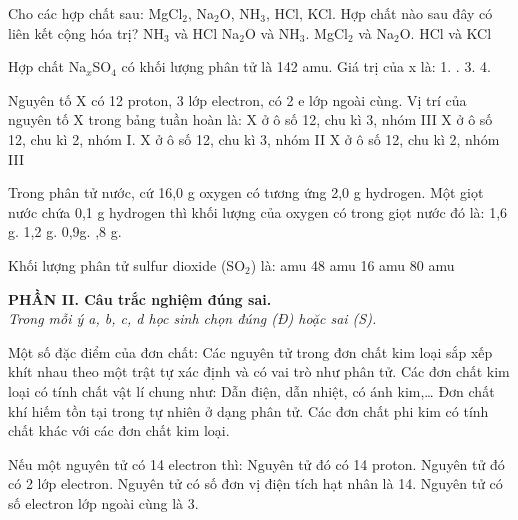 \documentclass[11pt,a4paper]{article}
\begin{document}
\begin{ex}
Cho các hợp chất sau: MgCl$_{2}$, Na$_{2}$O, NH$_{3}$, HCl, KCl. Hợp chất nào sau đây có liên kết cộng hóa trị?
\choice
{\True NH$_{3}$ và HCl}
{Na$_{2}$O và NH$_{3}$.}
{MgCl$_{2}$ và Na$_{2}$O.}
{HCl và KCl}
\end{ex}

\begin{ex}
Hợp chất Na$_{x}$SO$_{4}$ có khối lượng phân tử là 142 amu. Giá trị của x là:
\choice
{1.}
{.}
{3.}
{4.}
\end{ex}

\begin{ex}
Nguyên tố X có 12 proton, 3 lớp electron, có 2 e lớp ngoài cùng. Vị trí của nguyên tố X trong bảng tuần hoàn là:
\choice
{X ở ô số 12, chu kì 3, nhóm III}
{X ở ô số 12, chu kì 2, nhóm I.}
{\True X ở ô số 12, chu kì 3, nhóm II}
{X ở ô số 12, chu kì 2, nhóm III}
\end{ex}

\begin{ex}
Trong phân tử nước, cứ 16,0 g oxygen có tương ứng 2,0 g hydrogen. Một giọt nước chứa 0,1 g hydrogen thì khối lượng của oxygen có trong giọt nước đó là:
\choice
{1,6 g.}
{1,2 g.}
{0,9g.}
{,8 g.}
\end{ex}

\begin{ex}
Khối lượng phân tử sulfur dioxide (SO$_{2}$) là:
\choice
{ amu}
{48 amu}
{16 amu}
{80 amu}
\end{ex}


\vspace{4pt}
\noindent
\textbf{\color{mainGreen}PHẦN II. Câu trắc nghiệm đúng sai.}\\
\textit{Trong mỗi ý a, b, c, d học sinh chọn đúng (Đ) hoặc sai (S).}

\setcounter{ex}{0}

\begin{ex}
Một số đặc điểm của đơn chất:
\choiceTF
{\True Các nguyên tử trong đơn chất kim loại sắp xếp khít nhau theo một trật tự xác định và có vai trò như phân tử.}
{\True Các đơn chất kim loại có tính chất vật lí chung như: Dẫn điện, dẫn nhiệt, có ánh kim,\dots }
{Đơn chất khí hiếm tồn tại trong tự nhiên ở dạng phân tử.}
{\True Các đơn chất phi kim có tính chất khác với các đơn chất kim loại.}
\end{ex}

\begin{ex}
Nếu một nguyên tử có 14 electron thì:
\choiceTF
{\True Nguyên tử đó có 14 proton.}
{Nguyên tử đó có 2 lớp electron.}
{\True Nguyên tử có số đơn vị điện tích hạt nhân là 14.}
{Nguyên tử có số electron lớp ngoài cùng là 3.}
\end{ex}
\end{document}

